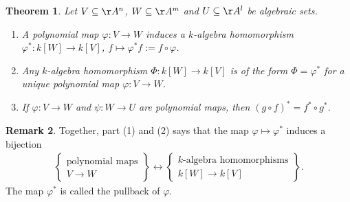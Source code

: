 \documentclass[12pt]{amsart}
\theoremstyle{plain}
\newtheorem{theorem}{Theorem}[subsection]
\theoremstyle{definition}
\newtheorem{remark}[theorem]{Remark}
\begin{document}
\begin{theorem}
Let $V \subseteq \AA^n$, $W \subseteq \AA^m$ and $U \subseteq \AA^l$ be algebraic sets.
\begin{enumerate}
\item
A polynomial map $\varphi:V \to W$ induces a $k$-algebra homomorphism $\varphi^*:k[W] \to k[V]$, $f \mapsto \varphi^*f := f \circ \varphi$.

\item
Any $k$-algebra homomorphism $\Phi:k[W] \to k[V]$ is of the form $\Phi = \varphi^*$ for a unique polynomial map $\varphi : V \to W$.

\item 
If $\varphi : V \to W$ and $\psi : W \to U$ are polynomial maps, then $(g \circ f)^* = f^* \circ g^*$.
\end{enumerate}
\end{theorem}
\begin{remark}
Together, part (1) and (2) says that the map $\varphi \mapsto \varphi^*$ induces a bijection
\begin{align*}\label{polynomialmapkalghombijection}
\left\{
\begin{array}{c}
	\text{polynomial maps} \\
	V \to W
\end{array}
\right\} \longleftrightarrow 
\left\{
\begin{array}{c}
	k\text{-algebra homomorphisms} \\
	k[W] \to k[V]
\end{array}
\right\}.
\end{align*}
The map $\varphi^*$ is called the pullback of $\varphi$.
\end{remark}
\end{document}
